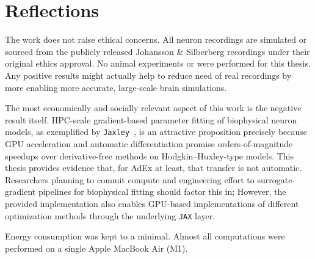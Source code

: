 \section{Reflections}
\label{sec:reflections}


The work does not raise ethical concerns.
All neuron recordings are simulated or sourced from the publicly released Johansson \& Silberberg recordings under their original ethics approval.
No animal experiments or were performed for this thesis.
Any positive results might actually help to reduce need of real recordings by more enabling more accurate,
large-scale brain simulations.

The most economically and socially relevant aspect of this work is the negative result itself.
\gls{HPC}-scale gradient-based parameter fitting of biophysical neuron models,
as exemplified by \texttt{Jaxley}~\cite{Deistler2025},
is an attractive proposition precisely because GPU acceleration and automatic differentiation promise orders-of-magnitude
speedups over derivative-free methods on Hodgkin--Huxley-type models.
This thesis provides evidence that, for \gls{AdEx} at least, that transfer is not automatic.
Researchers planning to commit compute and engineering effort to surrogate-gradient pipelines for biophysical fitting
should factor this in;
However, the provided implementation also enables GPU-based implementations of different optimization methods
through the underlying \texttt{JAX} layer.

Energy consumption was kept to a minimal.
Almost all computations were performed on a single Apple MacBook Air (M1).

